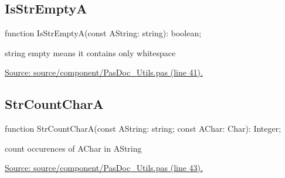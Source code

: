 \documentclass{report}
\newif\ifpdf
\begin{document}
\subsection*{IsStrEmptyA}
\fi
\label{PasDoc_Utils-IsStrEmptyA}
\begin{list}{}{
\setlength{\itemindent}{0cm}
\setlength{\listparindent}{0cm}
\setlength{\leftmargin}{\evensidemargin}
\addtolength{\leftmargin}{\tmplength}
\settowidth{\labelsep}{X}
\addtolength{\leftmargin}{\labelsep}
\setlength{\labelwidth}{\tmplength}
}
\item[\textbf{Declaration}\hfill]
\ifpdf
\begin{flushleft}
\fi
\begin{ttfamily}
function IsStrEmptyA(const AString: string): boolean;\end{ttfamily}

\ifpdf
\end{flushleft}
\fi

\par
\item[\textbf{Description}]
string empty means it contains only whitespace\par
\href{https://github.com/pasdoc/pasdoc/blob/master/source/component/PasDoc_Utils.pas#L41}{Source: source/component/PasDoc{\_}Utils.pas (line 41).}

\end{list}
\ifpdf
\subsection*{\large{\textbf{StrCountCharA}}\normalsize\hspace{1ex}\hrulefill}
\else
\subsection*{StrCountCharA}
\fi
\label{PasDoc_Utils-StrCountCharA}
\begin{list}{}{
\setlength{\itemindent}{0cm}
\setlength{\listparindent}{0cm}
\setlength{\leftmargin}{\evensidemargin}
\addtolength{\leftmargin}{\tmplength}
\settowidth{\labelsep}{X}
\addtolength{\leftmargin}{\labelsep}
\setlength{\labelwidth}{\tmplength}
}
\item[\textbf{Declaration}\hfill]
\ifpdf
\begin{flushleft}
\fi
\begin{ttfamily}
function StrCountCharA(const AString: string; const AChar: Char): Integer;\end{ttfamily}

\ifpdf
\end{flushleft}
\fi

\par
\item[\textbf{Description}]
count occurences of AChar in AString\par
\href{https://github.com/pasdoc/pasdoc/blob/master/source/component/PasDoc_Utils.pas#L43}{Source: source/component/PasDoc{\_}Utils.pas (line 43).}

\end{list}
\ifpdf
\end{document}
